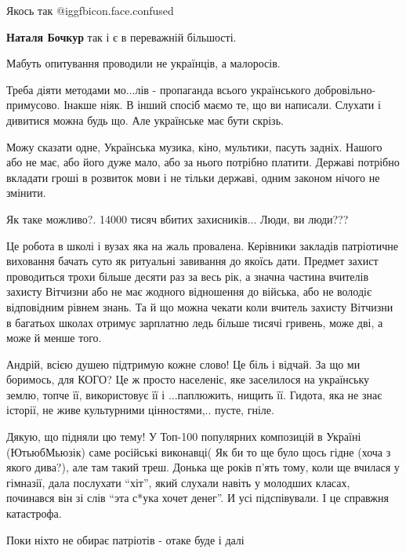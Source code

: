 \begin{itemize}
Якось так @igg{fbicon.face.confused} 

\textbf{Наталя Бочкур} так і є в переважній більшості.

Мабуть опитування проводили не українців, а малоросів.


Треба діяти методами мо...лів - пропаганда всього українського
добровільно-примусово. Інакше ніяк. В інший спосіб маємо те, що ви написали.
Слухати і дивитися можна будь що. Але українське має бути скрізь.


Можу сказати одне, Українська музика, кіно, мультики, пасуть задніх. Нашого або
не має, або його дуже мало, або за нього потрібно платити. Державі потрібно
вкладати гроші в розвиток мови і не тільки державі, одним законом нічого не
змінити.

Як таке можливо?. 14000 тисяч вбитих захисників... Люди, ви люди???


Це робота в школі і вузах яка на жаль провалена. Керівники закладів патріотичне
виховання бачать суто як ритуальні завивання до якоїсь дати. Предмет захист
проводиться трохи більше десяти раз за весь рік, а значна частина вчителів
захисту Вітчизни або не має жодного відношення до війська, або не володіє
відповідним рівнем знань. Та й що можна чекати коли вчитель захисту Вітчизни в
багатьох школах отримує зарплатню ледь більше тисячі гривень, може дві, а може
й менше того.


Андрій, всією душею підтримую кожне слово! Це біль і відчай. За що ми боримось,
для КОГО? Це ж просто населеніє, яке заселилося на українську землю, топче її,
використовує її і ...паплюжить, нищить її. Гидота, яка не знає історії, не живе
культурними цінностями,.. пусте, гніле.


Дякую, що підняли цю тему! У Топ-100 популярних композицій в Україні
(ЮтьюбМьюзік) саме російські виконавці( Як би то ще було щось гідне (хоча з
якого дива?), але там такий треш. Донька ще років п'ять тому, коли ще вчилася у
гімназії, дала послухати \enquote{хіт}, який слухали навіть у молодших класах,
починався він зі слів \enquote{эта с*ука хочет денег}. И усі підспівували. І це
справжня катастрофа.


Поки ніхто не обирає патріотів - отаке буде і далі


\end{itemize}
